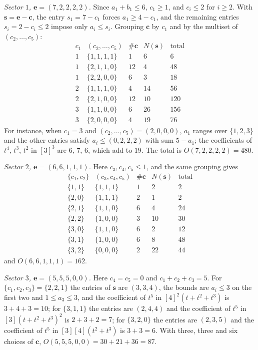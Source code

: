 \documentclass[11pt]{amsart}
\theoremstyle{definition}
\theoremstyle{remark}
\newcommand{\cc}{\mathbf{c}}
\newcommand{\ee}{\mathbf{e}}
\begin{document}
\emph{Sector $1$, $\ee=(7,2,2,2,2)$.} Since $a_1+b_1\le6$, $c_1\ge1$, and
$c_i\le2$ for $i\ge2$. With $\mathbf s=\ee-\cc$, the entry $s_1=7-c_1$
forces $a_1\ge4-c_1$, and the remaining entries $s_i=2-c_i\le2$ impose only
$a_i\le s_i$. Grouping $\cc$ by $c_1$ and by the multiset of
$(c_2,\dots,c_5)$:
\[
\begin{array}{l|l|r|r|r}
c_1&(c_2,\dots,c_5)&\#\cc&N(\mathbf s)&\text{total}\\\hline
1&\{1,1,1,1\}&1&6&6\\
1&\{2,1,1,0\}&12&4&48\\
1&\{2,2,0,0\}&6&3&18\\
2&\{1,1,1,0\}&4&14&56\\
2&\{2,1,0,0\}&12&10&120\\
3&\{1,1,0,0\}&6&26&156\\
3&\{2,0,0,0\}&4&19&76
\end{array}
\]
For instance, when $c_1=3$ and $(c_2,\dots,c_5)=(2,0,0,0)$, $a_1$ ranges
over $\{1,2,3\}$ and the other entries satisfy $a_i\le(0,2,2,2)$ with sum
$5-a_1$; the coefficients of $t^4$, $t^3$, $t^2$ in $[3]^3$ are $6$, $7$,
$6$, which add to $19$. The total is $O(7,2,2,2,2)=480$.

\emph{Sector $2$, $\ee=(6,6,1,1,1)$.} Here $c_3,c_4,c_5\le1$, and the same
grouping gives
\[
\begin{array}{l|l|r|r|r}
\{c_1,c_2\}&(c_3,c_4,c_5)&\#\cc&N(\mathbf s)&\text{total}\\\hline
\{1,1\}&\{1,1,1\}&1&2&2\\
\{2,0\}&\{1,1,1\}&2&1&2\\
\{2,1\}&\{1,1,0\}&6&4&24\\
\{2,2\}&\{1,0,0\}&3&10&30\\
\{3,0\}&\{1,1,0\}&6&2&12\\
\{3,1\}&\{1,0,0\}&6&8&48\\
\{3,2\}&\{0,0,0\}&2&22&44
\end{array}
\]
and $O(6,6,1,1,1)=162$.

\emph{Sector $3$, $\ee=(5,5,5,0,0)$.} Here $c_4=c_5=0$ and
$c_1+c_2+c_3=5$. For $\{c_1,c_2,c_3\}=\{2,2,1\}$ the entries of
$\mathbf s$ are $(3,3,4)$, the bounds are $a_i\le3$ on the first two and
$1\le a_3\le3$, and the coefficient of $t^5$ in $[4]^2(t+t^2+t^3)$ is
$3+4+3=10$; for $\{3,1,1\}$ the entries are $(2,4,4)$ and the coefficient of
$t^5$ in $[3](t+t^2+t^3)^2$ is $2+3+2=7$; for $\{3,2,0\}$ the entries are
$(2,3,5)$ and the coefficient of $t^5$ in $[3][4](t^2+t^3)$ is $3+3=6$. With
three, three and six choices of $\cc$, $O(5,5,5,0,0)=30+21+36=87$.
\end{document}
